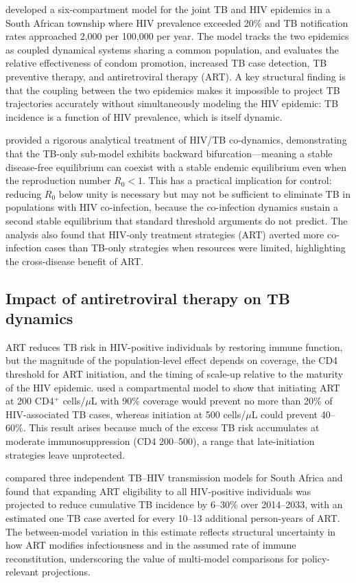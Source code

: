 \documentclass[11pt]{article}
\begin{document}
\citet{bacaer2008modeling} developed a six-compartment model for the joint TB and HIV epidemics in a South African township where HIV prevalence exceeded 20\% and TB notification rates approached 2{,}000 per 100{,}000 per year. The model tracks the two epidemics as coupled dynamical systems sharing a common population, and evaluates the relative effectiveness of condom promotion, increased TB case detection, TB preventive therapy, and antiretroviral therapy (ART). A key structural finding is that the coupling between the two epidemics makes it impossible to project TB trajectories accurately without simultaneously modeling the HIV epidemic: TB incidence is a function of HIV prevalence, which is itself dynamic.

\citet{sharomi2008mathematical} provided a rigorous analytical treatment of HIV/TB co-dynamics, demonstrating that the TB-only sub-model exhibits backward bifurcation---meaning a stable disease-free equilibrium can coexist with a stable endemic equilibrium even when the reproduction number $R_0 < 1$. This has a practical implication for control: reducing $R_0$ below unity is necessary but may not be sufficient to eliminate TB in populations with HIV co-infection, because the co-infection dynamics sustain a second stable equilibrium that standard threshold arguments do not predict. The analysis also found that HIV-only treatment strategies (ART) averted more co-infection cases than TB-only strategies when resources were limited, highlighting the cross-disease benefit of ART.

\subsection{Impact of antiretroviral therapy on TB dynamics}

ART reduces TB risk in HIV-positive individuals by restoring immune function, but the magnitude of the population-level effect depends on coverage, the CD4 threshold for ART initiation, and the timing of scale-up relative to the maturity of the HIV epidemic. \citet{williams2003antiretroviral} used a compartmental model to show that initiating ART at 200 CD4$^+$ cells/$\mu$L with 90\% coverage would prevent no more than 20\% of HIV-associated TB cases, whereas initiation at 500 cells/$\mu$L could prevent 40--60\%. This result arises because much of the excess TB risk accumulates at moderate immunosuppression (CD4 200--500), a range that late-initiation strategies leave unprotected.

\citet{pretorius2014potential} compared three independent TB--HIV transmission models for South Africa and found that expanding ART eligibility to all HIV-positive individuals was projected to reduce cumulative TB incidence by 6--30\% over 2014--2033, with an estimated one TB case averted for every 10--13 additional person-years of ART. The between-model variation in this estimate reflects structural uncertainty in how ART modifies infectiousness and in the assumed rate of immune reconstitution, underscoring the value of multi-model comparisons for policy-relevant projections.
\end{document}
